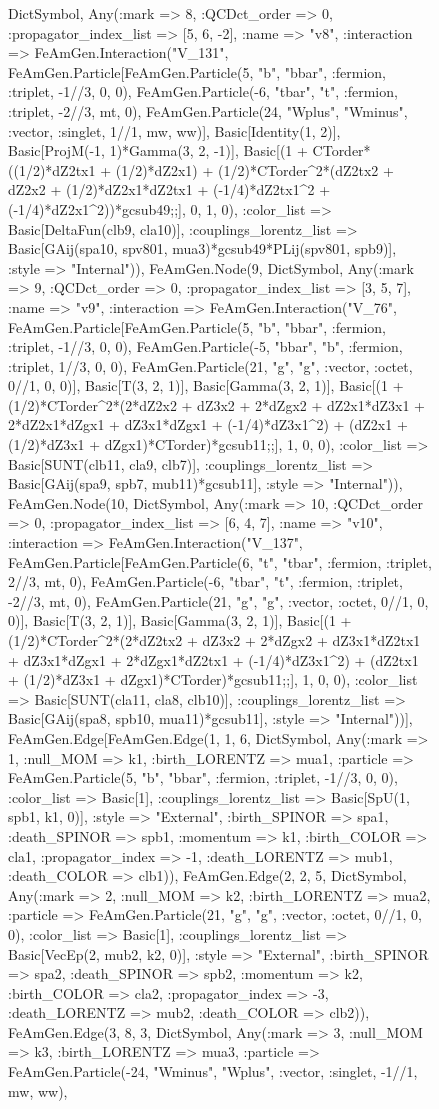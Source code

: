 \documentclass{revtex4}
\begin{document}
\begin{figure}[!htb]
\begin{center}
{Dict{Symbol, Any}(:mark => 8, :QCDct_order => 0, :propagator_index_list => [5, 6, -2], :name => "v8", :interaction => FeAmGen.Interaction("V_131", FeAmGen.Particle[FeAmGen.Particle(5, "b", "bbar", :fermion, :triplet, -1//3, 0, 0), FeAmGen.Particle(-6, "tbar", "t", :fermion, :triplet, -2//3, mt, 0), FeAmGen.Particle(24, "Wplus", "Wminus", :vector, :singlet, 1//1, mw, ww)], Basic[Identity(1, 2)], Basic[ProjM(-1, 1)*Gamma(3, 2, -1)], Basic[(1 + CTorder*((1/2)*dZ2tx1 + (1/2)*dZ2x1) + (1/2)*CTorder^2*(dZ2tx2 + dZ2x2 + (1/2)*dZ2x1*dZ2tx1 + (-1/4)*dZ2tx1^2 + (-1/4)*dZ2x1^2))*gcsub49;;], 0, 1, 0), :color_list => Basic[DeltaFun(clb9, cla10)], :couplings_lorentz_list => Basic[GAij(spa10, spv801, mua3)*gcsub49*PLij(spv801, spb9)], :style => "Internal")), FeAmGen.Node(9, Dict{Symbol, Any}(:mark => 9, :QCDct_order => 0, :propagator_index_list => [3, 5, 7], :name => "v9", :interaction => FeAmGen.Interaction("V_76", FeAmGen.Particle[FeAmGen.Particle(5, "b", "bbar", :fermion, :triplet, -1//3, 0, 0), FeAmGen.Particle(-5, "bbar", "b", :fermion, :triplet, 1//3, 0, 0), FeAmGen.Particle(21, "g", "g", :vector, :octet, 0//1, 0, 0)], Basic[T(3, 2, 1)], Basic[Gamma(3, 2, 1)], Basic[(1 + (1/2)*CTorder^2*(2*dZ2x2 + dZ3x2 + 2*dZgx2 + dZ2x1*dZ3x1 + 2*dZ2x1*dZgx1 + dZ3x1*dZgx1 + (-1/4)*dZ3x1^2) + (dZ2x1 + (1/2)*dZ3x1 + dZgx1)*CTorder)*gcsub11;;], 1, 0, 0), :color_list => Basic[SUNT(clb11, cla9, clb7)], :couplings_lorentz_list => Basic[GAij(spa9, spb7, mub11)*gcsub11], :style => "Internal")), FeAmGen.Node(10, Dict{Symbol, Any}(:mark => 10, :QCDct_order => 0, :propagator_index_list => [6, 4, 7], :name => "v10", :interaction => FeAmGen.Interaction("V_137", FeAmGen.Particle[FeAmGen.Particle(6, "t", "tbar", :fermion, :triplet, 2//3, mt, 0), FeAmGen.Particle(-6, "tbar", "t", :fermion, :triplet, -2//3, mt, 0), FeAmGen.Particle(21, "g", "g", :vector, :octet, 0//1, 0, 0)], Basic[T(3, 2, 1)], Basic[Gamma(3, 2, 1)], Basic[(1 + (1/2)*CTorder^2*(2*dZ2tx2 + dZ3x2 + 2*dZgx2 + dZ3x1*dZ2tx1 + dZ3x1*dZgx1 + 2*dZgx1*dZ2tx1 + (-1/4)*dZ3x1^2) + (dZ2tx1 + (1/2)*dZ3x1 + dZgx1)*CTorder)*gcsub11;;], 1, 0, 0), :color_list => Basic[SUNT(cla11, cla8, clb10)], :couplings_lorentz_list => Basic[GAij(spa8, spb10, mua11)*gcsub11], :style => "Internal"))], FeAmGen.Edge[FeAmGen.Edge(1, 1, 6, Dict{Symbol, Any}(:mark => 1, :null_MOM => k1, :birth_LORENTZ => mua1, :particle => FeAmGen.Particle(5, "b", "bbar", :fermion, :triplet, -1//3, 0, 0), :color_list => Basic[1], :couplings_lorentz_list => Basic[SpU(1, spb1, k1, 0)], :style => "External", :birth_SPINOR => spa1, :death_SPINOR => spb1, :momentum => k1, :birth_COLOR => cla1, :propagator_index => -1, :death_LORENTZ => mub1, :death_COLOR => clb1)), FeAmGen.Edge(2, 2, 5, Dict{Symbol, Any}(:mark => 2, :null_MOM => k2, :birth_LORENTZ => mua2, :particle => FeAmGen.Particle(21, "g", "g", :vector, :octet, 0//1, 0, 0), :color_list => Basic[1], :couplings_lorentz_list => Basic[VecEp(2, mub2, k2, 0)], :style => "External", :birth_SPINOR => spa2, :death_SPINOR => spb2, :momentum => k2, :birth_COLOR => cla2, :propagator_index => -3, :death_LORENTZ => mub2, :death_COLOR => clb2)), FeAmGen.Edge(3, 8, 3, Dict{Symbol, Any}(:mark => 3, :null_MOM => k3, :birth_LORENTZ => mua3, :particle => FeAmGen.Particle(-24, "Wminus", "Wplus", :vector, :singlet, -1//1, mw, ww), }
\end{center}
\end{figure}
\end{document}
